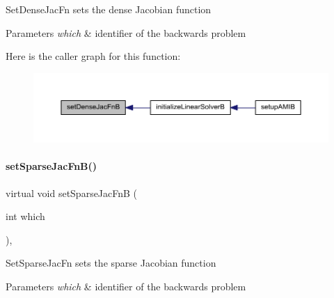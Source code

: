 Set\+Dense\+Jac\+Fn sets the dense Jacobian function


\begin{DoxyParams}{Parameters}
{\em which} & identifier of the backwards problem \\
\hline
\end{DoxyParams}
Here is the caller graph for this function\+:
\nopagebreak
\begin{figure}[H]
\begin{center}
\leavevmode
\includegraphics[width=350pt]{classamici_1_1_solver_a1081b1ac835a2bf9221552a07d04ef4d_icgraph}
\end{center}
\end{figure}
\mbox{\label{classamici_1_1_solver_a101c62151da172cc06a025a3060b50de}} 
\paragraph{\texorpdfstring{set\+Sparse\+Jac\+Fn\+B()}{setSparseJacFnB()}}
{\footnotesize\ttfamily virtual void set\+Sparse\+Jac\+FnB (\begin{DoxyParamCaption}\item[{int}]{which }\end{DoxyParamCaption})\hspace{0.3cm}{\ttfamily [protected]}, {}}

Set\+Sparse\+Jac\+Fn sets the sparse Jacobian function


\begin{DoxyParams}{Parameters}
{\em which} & identifier of the backwards problem \\
\hline
\end{DoxyParams}
\mbox{\label{classamici_1_1_solver_a1040308561e87b1e2d24c3ab9581e14d}} 
